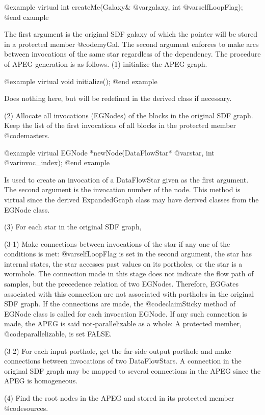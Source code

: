 @example
virtual int createMe(Galaxy& @var{galaxy}, int @var{selfLoopFlag});
@end example

The first argument is the original SDF galaxy of which the pointer will
be stored in a protected member @code{myGal}. The second argument
enforces to make arcs between invocations of the same star regardless
of the dependency. The procedure of APEG generation is as follows.
(1) initialize the APEG graph.

@example
virtual void initialize();
@end example

Does nothing here, but will be redefined in the derived class if necessary.

(2) Allocate all invocations (EGNodes) of the blocks in the original SDF
graph. Keep the list of the first invocations of all blocks in the protected
member @code{masters}. 

@example
virtual EGNode *newNode(DataFlowStar* @var{star}, int @var{invoc_index});
@end example

Is used to create an invocation of a DataFlowStar given as the first
argument. The second argument is the invocation number of the node.
This method is virtual since the derived ExpandedGraph class may have
derived classes from the EGNode class.

(3) For each star in the original SDF graph, 

(3-1) Make connections between invocations of the star if any one of the
conditions is met: @var{selfLoopFlag} is set in the second argument,
the star has internal states, the star accesses past values on its
portholes, or the star is a wormhole. The connection made in this
stage does not indicate the flow path of samples, but the
precedence relation of two EGNodes. Therefore, EGGates associated
with this connection are not associated with portholes in the
original SDF graph. If the connections are made, 
the @code{claimSticky} method of EGNode class is called for each
invocation EGNode. If any such connection is made, the APEG
is said not-parallelizable as a whole: A protected member,
@code{parallelizable}, is set FALSE.

(3-2) For each input porthole, get the far-side output porthole and make
connections between invocations of two DataFlowStars. A connection
in the original SDF graph may be mapped to several connections
in the APEG since the APEG is homogeneous. 

(4) Find the root nodes in the APEG and stored in its protected member
@code{sources}.

